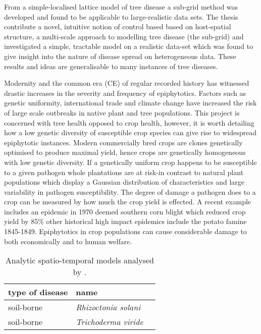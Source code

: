 From a simple-localised lattice model of tree disease a sub-grid method was developed and found to be applicable to large-realistic data sets. The thesis contribute a novel, intuitive notion of control based based on host-spatial structure, a multi-scale approach to modelling tree disease (the sub-grid) and investigated a simple, tractable model on a realistic data-set which was found to give insight into the nature of disease spread on heterogeneous data. These results and ideas are generalisable to many instances of tree diseases.


Modernity and the common era (CE) of regular recorded history has witnessed drastic increases in the severity and frequency of epiphytotics. Factors such as genetic uniformity, international trade and climate change have increased the risk of large scale outbreaks in native plant and tree populations. This project is concerned with tree health opposed to crop health, however, it is worth detailing how a low genetic diversity of susceptible crop species can give rise to widespread epiphytotic instances. Modern commercially bred crops are clones genetically optimised to produce maximal yield, hence crops are genetically homogeneous with low genetic diversity. If a genetically uniform crop happens to be susceptible to a given pathogen whole plantations are at risk\--in contrast to natural plant populations which display a Gaussian distribution of characteristics and large variability in pathogen susceptibility. The degree of damage a pathogen does to a crop can be measured by how much the crop yield is effected. A recent example includes an epidemic in 1970 deemed southern corn blight which reduced crop yield by 85\% \cite{Tatum1113} other historical high impact epidemics include the potato famine 1845-1849. Epiphytotics in crop populations can cause considerable damage to both economically and to human welfare. 

\vspace{1em}
\begin{table}[h]
\centering
\begin{tabular}{l l l}
\hline
\textbf{type of disease} & \textbf{name} \\
\hline
soil-borne  & \textit{Rhizoctonia solani} \\ 
soil-borne & \textit{Trichoderma viride}
\hline
\end{tabular}
\caption{Analytic spatio-temporal models analysed by \cite{jeger1983analysing}.}
\label{table:1}
\end{table}

